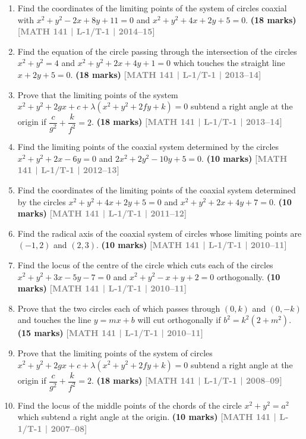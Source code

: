 \documentclass[12pt,a4paper]{article}
\newcommand{\yr}[1]{\hfill\textcolor{gray}{\small\textbf{[#1]}}}
\newcommand{\mk}[1]{\textcolor{orange!70!black}{\small\textbf{(#1 marks)}}}
\begin{document}
\begin{enumerate}
\item Find the coordinates of the limiting points of the system of circles coaxial with $x^{2}+y^{2}-2x+8y+11=0$ and $x^{2}+y^{2}+4x+2y+5=0$.
\mk{18} \yr{MATH 141 | L-1/T-1 | 2014--15}

\item Find the equation of the circle passing through the intersection of the circles $x^{2}+y^{2}=4$ and $x^{2}+y^{2}+2x+4y+1=0$ which touches the straight line $x+2y+5=0$.
\mk{18} \yr{MATH 141 | L-1/T-1 | 2013--14}

\item Prove that the limiting points of the system $x^{2}+y^{2}+2gx+c+\lambda(x^{2}+y^{2}+2fy+k)=0$ subtend a right angle at the origin if $\dfrac{c}{g^{2}}+\dfrac{k}{f^{2}}=2$.
\mk{18} \yr{MATH 141 | L-1/T-1 | 2013--14}

\item Find the limiting points of the coaxial system determined by the circles $x^{2}+y^{2}+2x-6y=0$ and $2x^{2}+2y^{2}-10y+5=0$.
\mk{10} \yr{MATH 141 | L-1/T-1 | 2012--13}

\item Find the coordinates of the limiting points of the coaxial system determined by the circles $x^{2}+y^{2}+4x+2y+5=0$ and $x^{2}+y^{2}+2x+4y+7=0$.
\mk{10} \yr{MATH 141 | L-1/T-1 | 2011--12}

\item Find the radical axis of the coaxial system of circles whose limiting points are $(-1,2)$ and $(2,3)$.
\mk{10} \yr{MATH 141 | L-1/T-1 | 2010--11}

\item Find the locus of the centre of the circle which cuts each of the circles $x^{2}+y^{2}+3x-5y-7=0$ and $x^{2}+y^{2}-x+y+2=0$ orthogonally.
\mk{10} \yr{MATH 141 | L-1/T-1 | 2010--11}

\item Prove that the two circles each of which passes through $(0,k)$ and $(0,-k)$ and touches the line $y=mx+b$ will cut orthogonally if $b^{2}=k^{2}(2+m^{2})$.
\mk{15} \yr{MATH 141 | L-1/T-1 | 2010--11}

\item Prove that the limiting points of the system of circles $x^{2}+y^{2}+2gx+c+\lambda(x^{2}+y^{2}+2fy+k)=0$ subtend a right angle at the origin if $\dfrac{c}{g^{2}}+\dfrac{k}{f^{2}}=2$.
\mk{18} \yr{MATH 141 | L-1/T-1 | 2008--09}

\item Find the locus of the middle points of the chords of the circle $x^{2}+y^{2}=a^{2}$ which subtend a right angle at the origin.
\mk{10} \yr{MATH 141 | L-1/T-1 | 2007--08}


\end{enumerate}
\end{document}
